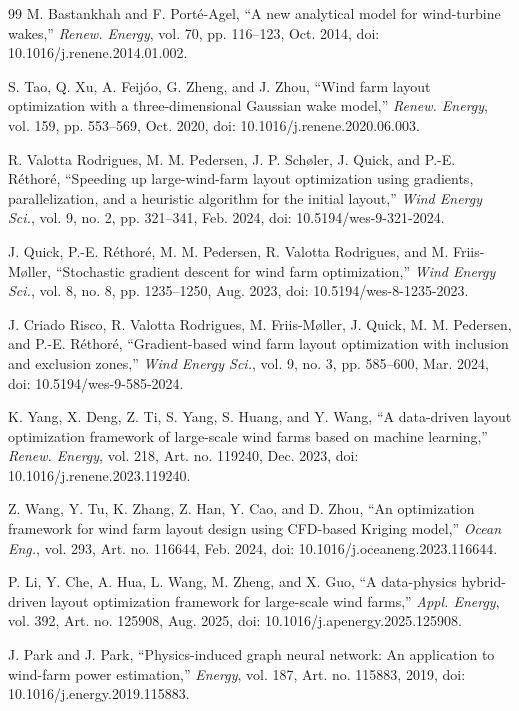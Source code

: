 {\begin{thebibliography}{99}
M. Bastankhah and F. Port\'e-Agel, ``A new analytical model for wind-turbine wakes,'' \textit{Renew. Energy}, vol. 70, pp. 116--123, Oct. 2014, doi: 10.1016/j.renene.2014.01.002.

S. Tao, Q. Xu, A. Feij\'oo, G. Zheng, and J. Zhou, ``Wind farm layout optimization with a three-dimensional Gaussian wake model,'' \textit{Renew. Energy}, vol. 159, pp. 553--569, Oct. 2020, doi: 10.1016/j.renene.2020.06.003.

R. Valotta Rodrigues, M. M. Pedersen, J. P. Sch\o{}ler, J. Quick, and P.-E. R\'ethor\'e, ``Speeding up large-wind-farm layout optimization using gradients, parallelization, and a heuristic algorithm for the initial layout,'' \textit{Wind Energy Sci.}, vol. 9, no. 2, pp. 321--341, Feb. 2024, doi: 10.5194/wes-9-321-2024.

J. Quick, P.-E. R\'ethor\'e, M. M. Pedersen, R. Valotta Rodrigues, and M. Friis-M\o{}ller, ``Stochastic gradient descent for wind farm optimization,'' \textit{Wind Energy Sci.}, vol. 8, no. 8, pp. 1235--1250, Aug. 2023, doi: 10.5194/wes-8-1235-2023.

J. Criado Risco, R. Valotta Rodrigues, M. Friis-M\o{}ller, J. Quick, M. M. Pedersen, and P.-E. R\'ethor\'e, ``Gradient-based wind farm layout optimization with inclusion and exclusion zones,'' \textit{Wind Energy Sci.}, vol. 9, no. 3, pp. 585--600, Mar. 2024, doi: 10.5194/wes-9-585-2024.

K. Yang, X. Deng, Z. Ti, S. Yang, S. Huang, and Y. Wang, ``A data-driven layout optimization framework of large-scale wind farms based on machine learning,'' \textit{Renew. Energy}, vol. 218, Art. no. 119240, Dec. 2023, doi: 10.1016/j.renene.2023.119240.

Z. Wang, Y. Tu, K. Zhang, Z. Han, Y. Cao, and D. Zhou, ``An optimization framework for wind farm layout design using CFD-based Kriging model,'' \textit{Ocean Eng.}, vol. 293, Art. no. 116644, Feb. 2024, doi: 10.1016/j.oceaneng.2023.116644.

P. Li, Y. Che, A. Hua, L. Wang, M. Zheng, and X. Guo, ``A data-physics hybrid-driven layout optimization framework for large-scale wind farms,'' \textit{Appl. Energy}, vol. 392, Art. no. 125908, Aug. 2025, doi: 10.1016/j.apenergy.2025.125908.

J. Park and J. Park, ``Physics-induced graph neural network: An application to wind-farm power estimation,'' \textit{Energy}, vol. 187, Art. no. 115883, 2019, doi: 10.1016/j.energy.2019.115883.


\end{thebibliography}}
